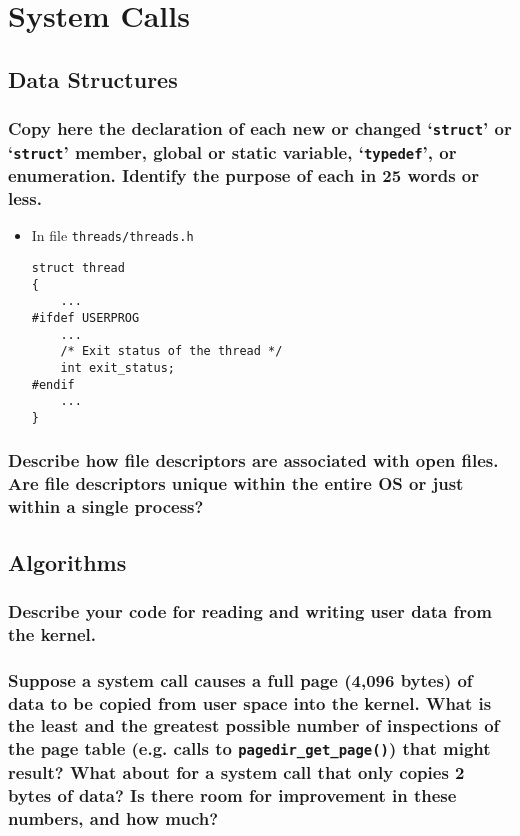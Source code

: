 \documentclass[sigconf, nonacm, balance=false, urlbreakonhyphens=true]{acmart}
\begin{document}
    \section{System Calls}

        \label{System Calls}

        \subsection{Data Structures}
            
            \subsubsection{Copy here the declaration of each new or changed `\texttt{struct}' or `\texttt{struct}' member, global or static variable, `\texttt{typedef}', or enumeration. Identify the purpose of each in 25 words or less. } 

                \begin{itemize}
                    \item In file \texttt{threads/threads.h}
\begin{verbatim}
struct thread
{
    ...
#ifdef USERPROG
    ...
    /* Exit status of the thread */
    int exit_status;
#endif
    ...
}\end{verbatim}
                \end{itemize}

            \subsubsection{Describe how file descriptors are associated with open files.  Are file descriptors unique within the entire OS or just within a single process? }

        \subsection{Algorithms}

            \subsubsection{Describe your code for reading and writing user data from the kernel. } 

            \subsubsection{Suppose a system call causes a full page (4,096 bytes) of data to be copied from user space into the kernel.  What is the least and the greatest possible number of inspections of the page table (e.g. calls to \texttt{pagedir\_get\_page()}) that might result?  What about for a system call that only copies 2 bytes of data?  Is there room for improvement in these numbers, and how much? }
\end{document}
